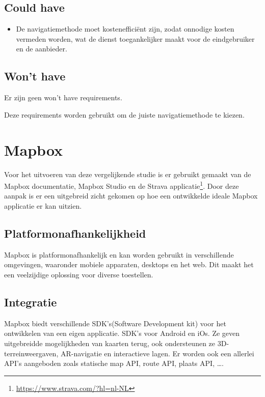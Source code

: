 \subsection*{Could have}
\begin{itemize}
    \item De navigatiemethode moet kostenefficiënt zijn, zodat onnodige kosten vermeden worden, wat de dienst toegankelijker maakt voor de eindgebruiker en de aanbieder.
\end{itemize}

\subsection*{Won't have}

Er zijn geen won't have requirements.


Deze requirements worden gebruikt om de juiste navigatiemethode te kiezen.




\section{Mapbox}
\label{sec:mapbox}

Voor het uitvoeren van deze vergelijkende studie is er gebruikt gemaakt van de Mapbox documentatie, Mapbox Studio en de Strava applicatie\footnote{\url{https://www.strava.com/?hl=nl-NL}}. Door deze aanpak is er een uitgebreid zicht gekomen op hoe een ontwikkelde ideale Mapbox applicatie er kan uitzien.

\subsection*{Platformonafhankelijkheid}
Mapbox is platformonafhankelijk en kan worden gebruikt in verschillende omgevingen, waaronder mobiele apparaten, desktops en het web. Dit maakt het een veelzijdige oplossing voor diverse toestellen.

\subsection*{Integratie}
Mapbox biedt verschillende SDK's(Software Development kit) voor het ontwikkelen van een eigen applicatie. SDK's voor Android en iOs. Ze geven uitgebreidde mogelijkheden van kaarten terug, ook ondersteunen ze 3D-terreinweergaven, AR-navigatie en interactieve lagen. Er worden ook een allerlei API's aangeboden zoals statische map API, route API, plaats API, \ldots .

